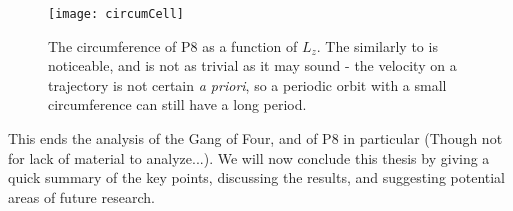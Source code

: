 \begin{figure}[h!]
\texttt{[image: circumCell]}
\caption{The circumference of P8 as a function of $L_z$. The similarly to  is noticeable, and is not as trivial as it may sound - the velocity on a trajectory is not certain \emph{a priori}, so a periodic orbit with a small circumference can still have a long period.}\label{fig:circumCell}
\end{figure}

\clearpage 
This ends the analysis of the Gang of Four, and of P8 in particular (Though not for lack of material to analyze...). We will now conclude this thesis by giving a quick summary of the key points, discussing the results, and suggesting potential areas of future research. 